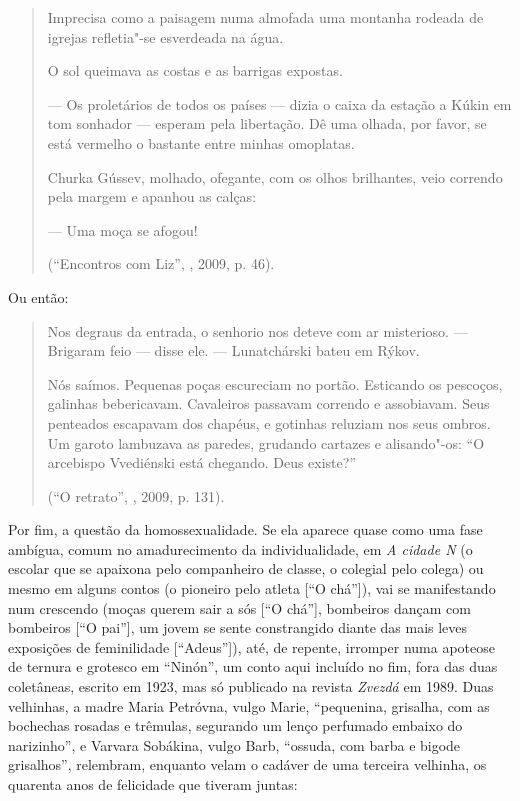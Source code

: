 \begin{quotation}
Imprecisa como a paisagem numa almofada uma montanha rodeada de igrejas
refletia"-se esverdeada na água.

O sol queimava as costas e as barrigas expostas.

--- Os proletários de todos os países --- dizia o caixa da estação a Kúkin
em tom sonhador --- esperam pela libertação. Dê uma olhada, por favor, se
está vermelho o bastante entre minhas omoplatas.

Churka Gússev, molhado, ofegante, com os olhos brilhantes, veio correndo
pela margem e apanhou as calças:

--- Uma moça se afogou!

(``Encontros com Liz'', , 2009, p. 46).
\end{quotation}

Ou então:

\begin{quotation}
Nos degraus da entrada, o senhorio nos deteve com ar misterioso.
--- Brigaram feio --- disse ele. --- Lunatchárski bateu em Rýkov.

Nós saímos. Pequenas poças escureciam no portão. Esticando os pescoços,
galinhas bebericavam. Cavaleiros passavam correndo e assobiavam. Seus
penteados escapavam dos chapéus, e gotinhas reluziam nos seus ombros. Um
garoto lambuzava as paredes, grudando cartazes e alisando"-os: ``O
arcebispo Vvediénski está chegando. Deus existe?''

(``O retrato'', , 2009, p. 131).
\end{quotation}

Por fim, a questão da homossexualidade. Se ela aparece quase como uma
fase ambígua, comum no amadurecimento da individualidade, em \emph{A
cidade N} (o escolar que se apaixona pelo companheiro de classe, o
colegial pelo colega) ou mesmo em alguns contos (o pioneiro pelo
atleta [``O chá'']), vai se manifestando num crescendo (moças querem
sair a sós [``O chá''], bombeiros dançam com bombeiros [``O pai''], um
jovem se sente constrangido diante das mais leves exposições de
feminilidade [``Adeus'']), até, de repente, irromper numa apoteose de
ternura e grotesco em ``Ninón'', um conto aqui incluído no fim, fora das
duas coletâneas, escrito em 1923, mas só publicado na revista
\emph{Zvezdá} em 1989. Duas velhinhas, a madre Maria Petróvna, vulgo
Marie, ``pequenina, grisalha, com as bochechas rosadas e trêmulas,
segurando um lenço perfumado embaixo do narizinho'', e Varvara Sobákina,
vulgo Barb, ``ossuda, com barba e bigode grisalhos'', relembram,
enquanto velam o cadáver de uma terceira velhinha, os quarenta anos de
felicidade que tiveram juntas:

